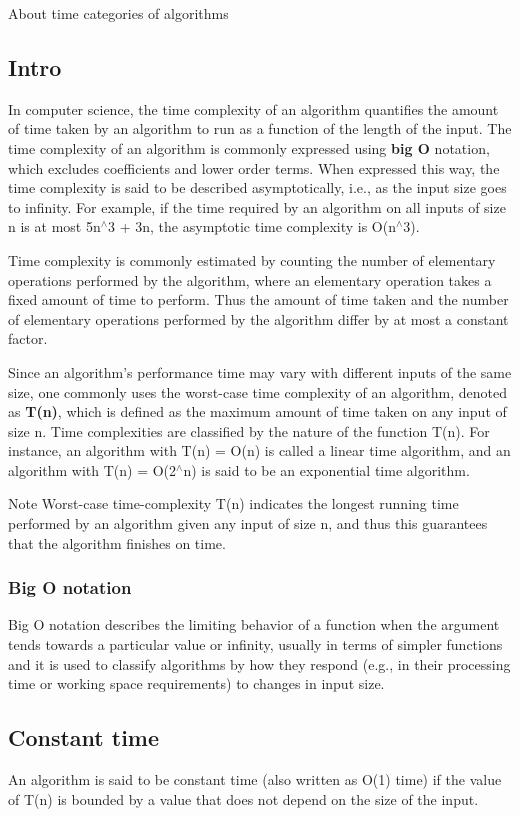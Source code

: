 About time categories of algorithms\hypertarget{time_complexity_tc_intro}{}\subsection{Intro}\label{time_complexity_tc_intro}
In computer science, the time complexity of an algorithm quantifies the amount of time taken by an algorithm to run as a function of the length of the input. The time complexity of an algorithm is commonly expressed using {\bfseries big O} notation, which excludes coefficients and lower order terms. When expressed this way, the time complexity is said to be described asymptotically, i.\-e., as the input size goes to infinity. For example, if the time required by an algorithm on all inputs of size {\ttfamily n} is at most {\ttfamily 5n$^\wedge$3 + 3n}, the asymptotic time complexity is {\ttfamily O(n$^\wedge$3)}.

Time complexity is commonly estimated by counting the number of elementary operations performed by the algorithm, where an elementary operation takes a fixed amount of time to perform. Thus the amount of time taken and the number of elementary operations performed by the algorithm differ by at most a constant factor.

Since an algorithm’s performance time may vary with different inputs of the same size, one commonly uses the worst-\/case time complexity of an algorithm, denoted as {\bfseries T(n)}, which is defined as the maximum amount of time taken on any input of size {\ttfamily n}. Time complexities are classified by the nature of the function {\ttfamily T(n)}. For instance, an algorithm with {\ttfamily T(n) = O(n)} is called a linear time algorithm, and an algorithm with {\ttfamily T(n) = O(2$^\wedge$n)} is said to be an exponential time algorithm.

\begin{DoxyNote}{Note}
Worst-\/case time-\/complexity {\ttfamily T(n)} indicates the longest running time performed by an algorithm given any input of size {\ttfamily n}, and thus this guarantees that the algorithm finishes on time.
\end{DoxyNote}
\hypertarget{time_complexity_tc_big_o}{}\subsubsection{Big O notation}\label{time_complexity_tc_big_o}
Big O notation describes the limiting behavior of a function when the argument tends towards a particular value or infinity, usually in terms of simpler functions and it is used to classify algorithms by how they respond (e.\-g., in their processing time or working space requirements) to changes in input size.\hypertarget{time_complexity_tc_constant_time}{}\subsection{Constant time}\label{time_complexity_tc_constant_time}
An algorithm is said to be constant time (also written as {\ttfamily O(1)} time) if the value of {\ttfamily T(n)} is bounded by a value that does not depend on the size of the input.

